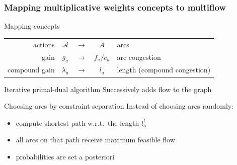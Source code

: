 \documentclass{beamer}
\begin{document}
\begin{frame}
    \frametitle{Mapping multiplicative weights concepts to multiflow}

    \begin{block}{Mapping concepts}
    \begin{tabular}{r | c c c | l}
    actions & $\mathcal{A}$ & $\to$ & $A$ & arcs\\
    gain & $g_a$ & $\to$ & $f_a / c_a$ & arc congestion\\
    compound gain & $\lambda_a$ & $\to$ & $l_a$ & length (compound congestion)
    \end{tabular}
    \end{block}

    \begin{block}{Iterative primal-dual algorithm}
        Successively adds flow to the graph
    \end{block}
    
    \begin{block}{Choosing arcs by constraint separation}
        Instead of choosing arcs randomly:
        \begin{itemize}
            \item compute shortest path w.r.t.\ the length $l_a^t$
            \item all arcs on that path receive maximum feasible flow
            \item probabilities are set a posteriori
        \end{itemize}
    \end{block}
\end{frame}
\end{document}
